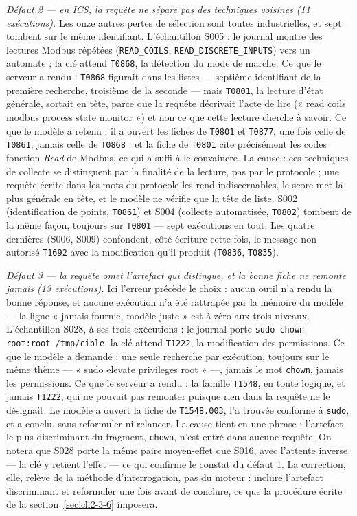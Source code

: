 \emph{Défaut 2 --- en ICS, la requête ne sépare pas des techniques voisines (11 exécutions).} Les onze autres pertes de sélection sont toutes industrielles, et sept tombent sur le même identifiant. L'échantillon S005 : le journal montre des lectures Modbus répétées (\texttt{READ\_COILS}, \texttt{READ\_DISCRETE\_INPUTS}) vers un automate ; la clé attend \texttt{T0868}, la détection du mode de marche. Ce que le serveur a rendu : \texttt{T0868} figurait dans les listes --- septième identifiant de la première recherche, troisième de la seconde --- mais \texttt{T0801}, la lecture d'état générale, sortait en tête, parce que la requête décrivait l'acte de lire (« read coils modbus process state monitor ») et non ce que cette lecture cherche à savoir. Ce que le modèle a retenu : il a ouvert les fiches de \texttt{T0801} et \texttt{T0877}, une fois celle de \texttt{T0861}, jamais celle de \texttt{T0868} ; et la fiche de \texttt{T0801} cite précisément les codes fonction \emph{Read} de Modbus, ce qui a suffi à le convaincre. La cause : ces techniques de collecte se distinguent par la finalité de la lecture, pas par le protocole ; une requête écrite dans les mots du protocole les rend indiscernables, le score met la plus générale en tête, et le modèle ne vérifie que la tête de liste. S002 (identification de points, \texttt{T0861}) et S004 (collecte automatisée, \texttt{T0802}) tombent de la même façon, toujours sur \texttt{T0801} --- sept exécutions en tout. Les quatre dernières (S006, S009) confondent, côté écriture cette fois, le message non autorisé \texttt{T1692} avec la modification qu'il produit (\texttt{T0836}, \texttt{T0835}).

\emph{Défaut 3 --- la requête omet l'artefact qui distingue, et la bonne fiche ne remonte jamais (13 exécutions).} Ici l'erreur précède le choix : aucun outil n'a rendu la bonne réponse, et aucune exécution n'a été rattrapée par la mémoire du modèle --- la ligne « jamais fournie, modèle juste » est à zéro aux trois niveaux. L'échantillon S028, à ses trois exécutions : le journal porte \texttt{sudo chown root:root /tmp/cible}, la clé attend \texttt{T1222}, la modification des permissions. Ce que le modèle a demandé : une seule recherche par exécution, toujours sur le même thème --- « sudo elevate privileges root » ---, jamais le mot \texttt{chown}, jamais les permissions. Ce que le serveur a rendu : la famille \texttt{T1548}, en toute logique, et jamais \texttt{T1222}, qui ne pouvait pas remonter puisque rien dans la requête ne le désignait. Le modèle a ouvert la fiche de \texttt{T1548.003}, l'a trouvée conforme à \texttt{sudo}, et a conclu, sans reformuler ni relancer. La cause tient en une phrase : l'artefact le plus discriminant du fragment, \texttt{chown}, n'est entré dans aucune requête. On notera que S028 porte la même paire moyen-effet que S016, avec l'attente inverse --- la clé y retient l'effet --- ce qui confirme le constat du défaut 1. La correction, elle, relève de la méthode d'interrogation, pas du moteur : inclure l'artefact discriminant et reformuler une fois avant de conclure, ce que la procédure écrite de la section~\ref{sec:ch2-3-6} imposera.

